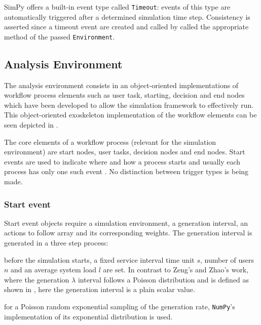 \documentclass{seal_thesis}
\begin{document}
SimPy offers a built-in event type called \texttt{Timeout}: events of this type are automatically triggered after a determined simulation time step. Consistency is asserted since a timeout event are created and called by called the appropriate method of the passed \texttt{Environment}.

\subsection{Analysis Environment}

The analysis environment consists in an object-oriented implementations of workflow process elements such as user task, starting, decision and end nodes which have been developed to allow the simulation framework to effectively run. This object-oriented exoskeleton implementation of the workflow elements can be seen depicted in .


The core elements of a workflow process (relevant for the simulation environment) are start nodes, user tasks, decision nodes and end nodes. Start events are used to indicate where and how a process starts and usually each process has only one such event \cite[p. 42]{Silver2011}. No distinction between trigger types is being made.

\subsubsection{Start event}

Start event objects require a simulation environment, a generation interval, an actions to follow array and its corresponding weights. The generation interval is generated in a three step process:
\begin{enumerate*}
 	\item before the simulation starts, a fixed service interval time unit $s$, number of users $n$ and an average system load $l$ are set. In contrast to Zeng's and Zhao's work, where the generation $\lambda$ interval follows a Poisson distribution \cite{Zeng2005} and is defined as shown in , here the generation interval is a plain scalar value.
 	\item for a Poisson random exponential sampling of the generation rate, \texttt{NumPy}'s implementation of its exponential distribution is used.
 \end{enumerate*}
\end{document}
